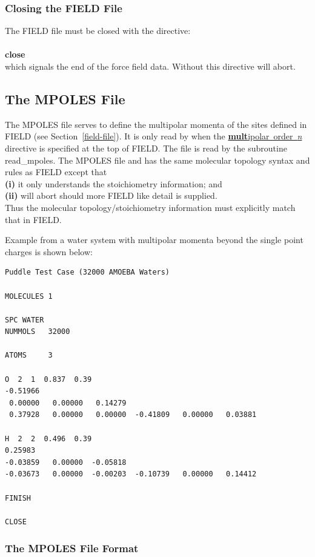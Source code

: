 \subsubsection{Closing the FIELD File}

The FIELD file must be closed with the directive:\\
\\
{\bf close}
\\
\noindent which signals the end of the force field data.  Without
this directive \D will abort.

\subsection{The MPOLES File}
\label{mpoles-file}

The MPOLES file serves to define the multipolar momenta of the
sites defined in FIELD (see Section~\ref{field-file}).  It is
only read by \D when the \underline{{\bf mult}ipolar~order~{\em n}}
directive is specified at the top of FIELD.  The file is read
by the subroutine {\sc read\_mpoles}.  The MPOLES file and has
the same molecular topology syntax and rules as FIELD except that \\
{\bf (i)} it only understands the stoichiometry information; and \\
{\bf (ii)} will abort should more FIELD like detail is supplied.\\
Thus the molecular topology/stoichiometry information must
explicitly match that in FIELD.

Example from a water system with multipolar momenta beyond the
single point charges is shown below:
\begin{lstlisting}
Puddle Test Case (32000 AMOEBA Waters)

MOLECULES 1

SPC WATER
NUMMOLS   32000

ATOMS     3

O  2  1  0.837  0.39
-0.51966
 0.00000   0.00000   0.14279
 0.37928   0.00000   0.00000  -0.41809   0.00000   0.03881

H  2  2  0.496  0.39
0.25983
-0.03859   0.00000  -0.05818
-0.03673   0.00000  -0.00203  -0.10739   0.00000   0.14412

FINISH

CLOSE
\end{lstlisting}

\subsubsection{The MPOLES File Format}

